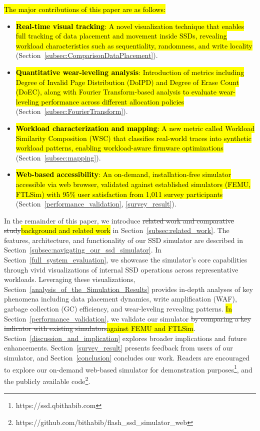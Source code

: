 \documentclass{ieeeaccess}
\begin{document}
\hl{The major contributions of this paper are as follows:}
\begin{itemize}
    \item \hl{\textbf{Real-time visual tracking}: A novel visualization technique that enables full tracking of data placement and movement inside SSDs, revealing workload characteristics such as sequentiality, randomness, and write locality} (Section~\ref{subsec:ComparisonDataPlacement}).
    \item \hl{\textbf{Quantitative wear-leveling analysis}: Introduction of metrics including Degree of Invalid Page Distribution (DoIPD) and Degree of Erase Count (DoEC), along with Fourier Transform-based analysis to evaluate wear-leveling performance across different allocation policies} (Section~\ref{subsec:FourierTransform}).
    \item \hl{\textbf{Workload characterization and mapping}: A new metric called Workload Similarity Composition (WSC) that classifies real-world traces into synthetic workload patterns, enabling workload-aware firmware optimizations} (Section~\ref{subsec:mapping}).
    \item \hl{\textbf{Web-based accessibility}: An on-demand, installation-free simulator accessible via web browser, validated against established simulators (FEMU, FTLSim) with 95\% user satisfaction from 1,011 survey participants} (Section~\ref{performance_validation}, \ref{survey_result}).
\end{itemize}

In the remainder of this paper, we introduce \sout{related work and comparative study}\hl{background and related work} in Section~\ref{subsec:related_work}.
The features, architecture, and functionality of our SSD simulator are described in Section~\ref{subsec:navigating_our_ssd_simulator}.
In Section~\ref{full_system_evaluation}, we showcase the simulator's core capabilities through vivid visualizations of internal SSD operations across representative workloads. Leveraging these visualizations, Section~\ref{analysis_of_the_Simulation_Results} provides in-depth analyses of key phenomena including data placement dynamics, write amplification (WAF), garbage collection (GC) efficiency, and wear-leveling revealing patterns. \hl{In} Section~\ref{performance_validation}, we validate our simulator \sout{by comparing a key indicator with existing simulators}\hl{against FEMU and FTLSim}. Section~\ref{discussion_and_implication} explores broader implications and future enhancements. Section~\ref{survey_result} presents feedback from users of our simulator, and Section~\ref{conclusion} concludes our work.
Readers are encouraged to explore our on-demand web-based simulator for demonstration purposes\footnote{https://ssd.qbithabib.com}, and the publicly available code\footnote{https://github.com/bithabib/flash\_ssd\_simulator\_web}.
\end{document}
